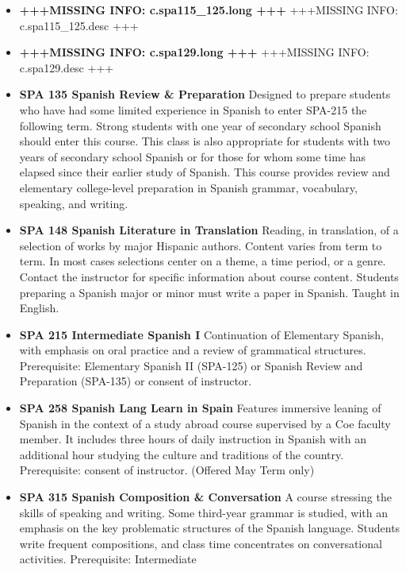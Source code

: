 \documentclass[
  letterpaper,
]{scrbook}
\providecommand{\tightlist}{%
  \setlength{\itemsep}{0pt}\setlength{\parskip}{0pt}}
\begin{document}
\begin{itemize}
\tightlist
\item
  \textbf{+++MISSING INFO: c.spa115\_125.long +++} +++MISSING INFO:
  c.spa115\_125.desc +++\\
\item
  \textbf{+++MISSING INFO: c.spa129.long +++} +++MISSING INFO:
  c.spa129.desc +++
\item
  \textbf{SPA 135 Spanish Review \& Preparation} Designed to prepare
  students who have had some limited experience in Spanish to enter
  SPA-215 the following term. Strong students with one year of secondary
  school Spanish should enter this course. This class is also
  appropriate for students with two years of secondary school Spanish or
  for those for whom some time has elapsed since their earlier study of
  Spanish. This course provides review and elementary college-level
  preparation in Spanish grammar, vocabulary, speaking, and writing.\\
\item
  \textbf{SPA 148 Spanish Literature in Translation} Reading, in
  translation, of a selection of works by major Hispanic authors.
  Content varies from term to term. In most cases selections center on a
  theme, a time period, or a genre. Contact the instructor for specific
  information about course content. Students preparing a Spanish major
  or minor must write a paper in Spanish. Taught in English.
\item
  \textbf{SPA 215 Intermediate Spanish I} Continuation of Elementary
  Spanish, with emphasis on oral practice and a review of grammatical
  structures. Prerequisite: Elementary Spanish II (SPA-125) or Spanish
  Review and Preparation (SPA-135) or consent of instructor.\\
\item
  \textbf{SPA 258 Spanish Lang Learn in Spain} Features immersive
  leaning of Spanish in the context of a study abroad course supervised
  by a Coe faculty member. It includes three hours of daily instruction
  in Spanish with an additional hour studying the culture and traditions
  of the country. Prerequisite: consent of instructor. (Offered May Term
  only)
\item
  \textbf{SPA 315 Spanish Composition \& Conversation} A course
  stressing the skills of speaking and writing. Some third-year grammar
  is studied, with an emphasis on the key problematic structures of the
  Spanish language. Students write frequent compositions, and class time
  concentrates on conversational activities. Prerequisite: Intermediate

\end{itemize}
\end{document}
